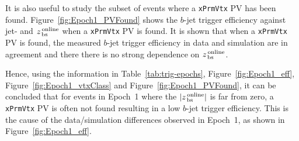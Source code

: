 It is also useful to study the subset of events where a \verb|xPrmVtx| PV has been found.
Figure~\ref{fig:Epoch1_PVFound} shows the $b$-jet trigger efficiency
against jet-\pT{} and $z_{\,\text{bs}}^{\text{\,online}}$ when a \verb|xPrmVtx| PV is found.
It is shown that when a \verb|xPrmVtx| PV is found, the measured $b$-jet trigger efficiency in data and simulation are in agreement
and there there is no strong dependence on $z_{\,\text{bs}}^{\text{\,online}}$.

Hence, using the information in Table~\ref{tab:trig-epochs}, Figure~\ref{fig:Epoch1_eff}, Figure~\ref{fig:Epoch1_vtxClass} and Figure~\ref{fig:Epoch1_PVFound},
it can be concluded that for events in  Epoch~1 where the  $|z_{\,\text{bs}}^{\text{\,online}}|$ is far from zero,
a \verb|xPrmVtx| PV is often not found resulting in a low $b$-jet trigger efficiency.
This is the cause of the data/simulation differences observed in Epoch~1, as shown in Figure~\ref{fig:Epoch1_eff}. 

